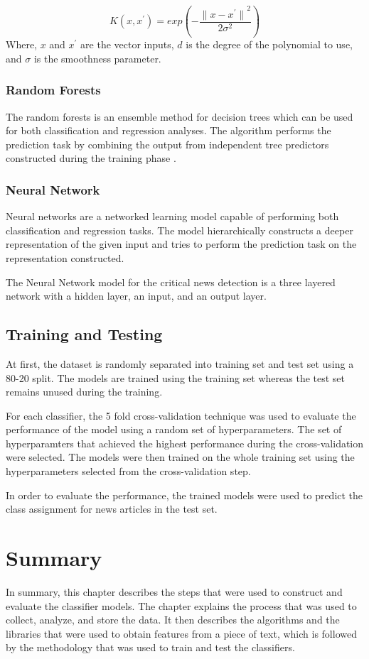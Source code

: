 \begin{equation}
    \label{eq:rbf_kernel}
    K(x, x^{'}) = exp(- \frac{{\lVert x - x^{'} \rVert}^{2}}{2 \sigma^{2}})
\end{equation}
Where, $x$ and $x^{'}$ are the vector inputs, $d$ is the degree of the polynomial to use, and $\sigma$ is the smoothness parameter.

\subsubsection{Random Forests}
The random forests\cite{breiman2001random} is an ensemble method for decision trees\cite{quinlan1986induction} which can be used for both classification and regression analyses. The algorithm performs the prediction task by combining the output from independent tree predictors constructed during the training phase \cite{breiman2001random}. 

\subsubsection{Neural Network}
Neural networks are a networked learning model capable of performing both classification and regression tasks. The model hierarchically constructs a deeper representation of the given input and tries to perform the prediction task on the representation constructed. 

The Neural Network model for the critical news detection is a three layered network with a hidden layer, an input, and an output layer.

\subsection{Training and Testing}
At first, the dataset is randomly separated into training set and test set using a 80-20 split. The models are trained using the training set whereas the test set remains unused during the training. 

For each classifier, the 5 fold cross-validation technique was used to evaluate the performance of the model using a random set of hyperparameters. The set of hyperparamters that achieved the highest performance during the cross-validation were selected. The models were then trained on the whole training set using the hyperparameters selected from the cross-validation step.

In order to evaluate the performance, the trained models were used to predict the class assignment for news articles in the test set. 

\section{Summary}
In summary, this chapter describes the steps that were used to construct and evaluate the classifier models. The chapter explains the process that was used to collect, analyze, and store the data. It then describes the algorithms and the libraries that were used to obtain features from a piece of text, which is followed by the methodology that was used to train and test the classifiers.